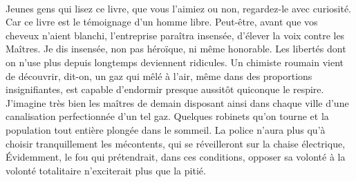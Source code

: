 \documentclass[french,twoside]{book} %
\begin{document}
\noindent  \par
Jeunes gens qui lisez ce livre, que vous l’aimiez ou non, regardez-le avec curiosité. Car ce livre est le témoignage d’un homme libre. Peut-être, avant que vos cheveux n’aient blanchi, l’entreprise paraîtra insensée, d’élever la voix contre les Maîtres. Je dis insensée, non pas héroïque, ni même honorable. Les libertés dont on n’use plus depuis longtemps deviennent ridicules. Un chimiste roumain vient de découvrir, dit-on, un gaz qui mêlé à l’air, même dans des proportions insignifiantes, est capable d’endormir presque aussitôt quiconque le respire. J’imagine très bien les maîtres de demain disposant ainsi dans chaque ville d’une canalisation perfectionnée d’un tel gaz. Quelques robinets qu’on tourne et la population tout entière plongée dans le sommeil. La police n’aura plus qu’à choisir tranquillement les mécontents, qui se réveilleront sur la chaise électrique, Évidemment, le fou qui prétendrait, dans ces conditions, opposer sa volonté à la volonté totalitaire n’exciterait plus que la pitié.\par
\end{document}
